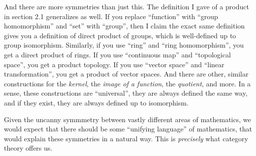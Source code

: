 And there are more symmetries than just this. The definition I gave of a product in section 2.1 generalizes as well. If you replace ``function'' with ``group homomorphism'' and ``set'' with ``group'', then I claim the exact same definition gives you a definition of direct product of groups, which is well-defined up to group isomorphism. Similarly, if you use ``ring'' and ``ring homomorphism'', you get a direct product of rings. If you use ``continuous map'' and ``topological space'', you get a product topology. If you use ``vector space'' and ``linear transformation'', you get a product of vector spaces. And there are other, similar constructions for the \emph{kernel}, the \emph{image of a function}, the \emph{quotient}, and more. In a sense, these constructions are ``universal'', they are always defined the same way, and if they exist, they are always defined up to isomorphism.

Given the uncanny symmmetry between vastly different areas of mathematics, we would expect that there should be some ``unifying language'' of mathematics, that would explain these symmetries in a natural way. This is \emph{precisely} what category theory offers us.

